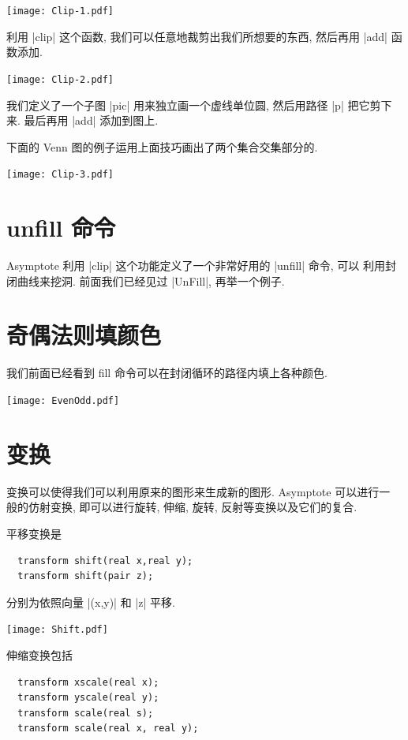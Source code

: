 \documentclass[nofonts,CJKnormalspaces]{ctexbook}
\begin{document}
\begin{center}\texttt{[image: Clip-1.pdf]}\end{center}%


利用 |clip| 这个函数, 我们可以任意地裁剪出我们所想要的东西, 然后再用
|add| 函数添加.
\begin{center}\texttt{[image: Clip-2.pdf]}\end{center}%


我们定义了一个子图 |pic| 用来独立画一个虚线单位圆, 然后用路径
|p| 把它剪下来. 最后再用 |add| 添加到图上.

下面的 Venn 图的例子运用上面技巧画出了两个集合交集部分的.
\begin{center}\texttt{[image: Clip-3.pdf]}\end{center}%


\section{unfill 命令}
Asymptote 利用 |clip| 这个功能定义了一个非常好用的 |unfill| 命令, 可以
利用封闭曲线来挖洞. 前面我们已经见过 |UnFill|, 再举一个例子.

\section{奇偶法则填颜色}

我们前面已经看到 {fill} 命令可以在封闭循环的路径内填上各种颜色.
\begin{center}\texttt{[image: EvenOdd.pdf]}\end{center}%

\section{变换}
变换可以使得我们可以利用原来的图形来生成新的图形. Asymptote 可以进行一
般的仿射变换, 即可以进行旋转, 伸缩, 旋转, 反射等变换以及它们的复合.

平移变换是
\begin{lstlisting}
  transform shift(real x,real y);
  transform shift(pair z);
\end{lstlisting}
分别为依照向量 |(x,y)| 和 |z| 平移.

\begin{center}\texttt{[image: Shift.pdf]}\end{center}%


伸缩变换包括
\begin{lstlisting}
  transform xscale(real x);
  transform yscale(real y);
  transform scale(real s);
  transform scale(real x, real y);
\end{lstlisting}
\end{document}
